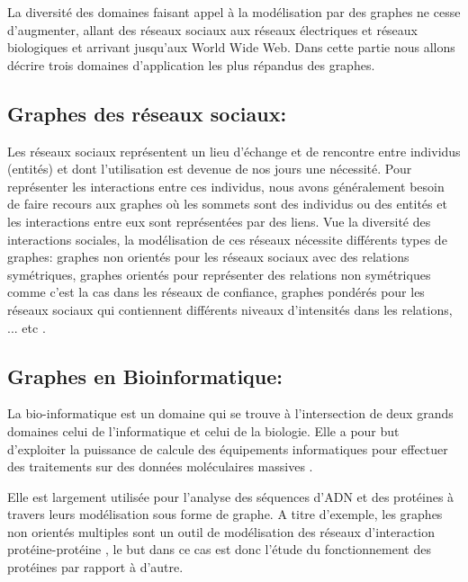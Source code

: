   La diversité des domaines faisant appel à la modélisation par des graphes ne cesse d'augmenter, allant des réseaux sociaux aux réseaux électriques et réseaux biologiques et arrivant jusqu'aux World Wide Web. Dans cette partie nous allons décrire trois domaines d'application les plus répandus des graphes.
	
		\subsection{Graphes des réseaux sociaux:}
		Les réseaux sociaux représentent un lieu d'échange et de rencontre entre individus (entités) et dont l'utilisation est devenue de nos jours une nécessité.  
		Pour représenter les interactions entre ces individus, nous avons généralement besoin de faire recours aux graphes où les sommets sont des individus ou des entités et les interactions entre eux sont représentées par des liens. 
		Vue la diversité des interactions sociales, la modélisation de ces réseaux  nécessite différents types de graphes: graphes non orientés pour les réseaux sociaux avec des relations  symétriques, graphes orientés pour représenter des relations non symétriques
comme c'est la cas dans les réseaux de confiance, graphes pondérés pour les réseaux sociaux qui contiennent différents niveaux d'intensités dans les relations, ... etc \citep{lemmouchi2012etude}.
		
		\subsection{Graphes en Bioinformatique:}
		
		La bio-informatique est un domaine qui se trouve à l'intersection de deux grands domaines celui de l'informatique et celui de la biologie. Elle a pour but d'exploiter la puissance de calcule des équipements informatiques pour effectuer des traitements sur des données moléculaires massives \citep{pellegrini2004protein}.
		
		Elle est largement utilisée pour l’analyse des séquences d’ADN et des protéines à travers leurs modélisation sous forme de graphe. A titre d'exemple, les graphes non orientés multiples sont un outil de modélisation des réseaux d’interaction protéine-protéine \citep{pellegrini2004protein}, 
		le but dans ce cas est donc l'étude du fonctionnement des protéines par rapport à d'autre.
		
